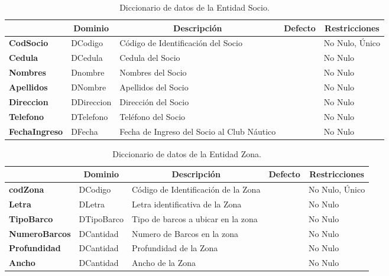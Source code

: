 \begin{table}[H]
\centering
\caption{Diccionario de datos de la Entidad Socio.}
\label{tab-Dicc-34}
\begin{tabular}{>{\bfseries}m{4.0cm}>{}m{3.0cm}>{}m{6.0cm}>{}m{5.0cm}>{}m{2.0cm}}
\toprule
\multicolumn{1}{c}{\textbf{Atributo}} & \multicolumn{1}{c}{\textbf{Dominio}} & \multicolumn{1}{c}{\textbf{Descripción}} & \multicolumn{1}{c}{\textbf{Defecto}} & \multicolumn{1}{c}{\textbf{Restricciones}} \\ \midrule
CodSocio	&	DCodigo	&	Código de Identificación del Socio	&		&	No Nulo, Único\\
Cedula	&	DCedula	&	Cedula del Socio	&		&	No Nulo\\
Nombres	&	Dnombre	&	Nombres del Socio	&		&	No Nulo\\
Apellidos	&	DNombre	&	Apellidos del Socio	&		&	No Nulo\\
Direccion	&	DDireccion	&	Dirección del Socio	&		&	No Nulo\\
Telefono	&	DTelefono	&	Teléfono del Socio	&		&	No Nulo\\
FechaIngreso	&	DFecha	&	Fecha de Ingreso del Socio al Club Náutico	&		&	No Nulo\\
\bottomrule
\end{tabular}
\end{table}

\begin{table}[H]
\centering
\caption{Diccionario de datos de la Entidad Zona.}
\label{tab-Dicc-35}
\begin{tabular}{>{\bfseries}m{4.0cm}>{}m{3.0cm}>{}m{6.0cm}>{}m{5.0cm}>{}m{2.0cm}}
\toprule
\multicolumn{1}{c}{\textbf{Atributo}} & \multicolumn{1}{c}{\textbf{Dominio}} & \multicolumn{1}{c}{\textbf{Descripción}} & \multicolumn{1}{c}{\textbf{Defecto}} & \multicolumn{1}{c}{\textbf{Restricciones}} \\ \midrule
codZona	&	DCodigo	&	Código de Identificación de la Zona	&		&	No Nulo, Único\\
Letra	&	DLetra	&	Letra identificativa de la Zona	&		&	No Nulo\\
TipoBarco	&	DTipoBarco	&	Tipo de barcos a ubicar en la zona	&		&	No Nulo\\
NumeroBarcos	&	DCantidad	&	Numero de Barcos en la zona	&		&	No Nulo\\
Profundidad	&	DCantidad	&	Profundidad de la Zona	&		&	No Nulo\\
Ancho	&	DCantidad	&	Ancho de la Zona	&		&	No Nulo\\
\bottomrule
\end{tabular}
\end{table}

